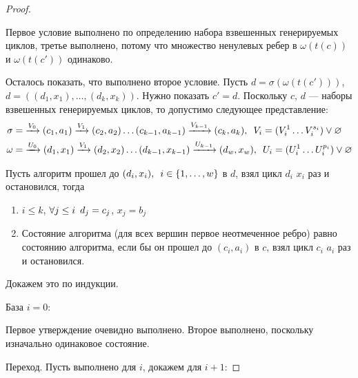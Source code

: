 \documentclass{article}
\newcommand{\squad}{
    \hspace{0.5em}
}
\begin{document}
\begin{proof} $ $
    
    Первое условие выполнено по определению набора взвешенных генерируемых циклов, третье выполнено, потому что множество ненулевых ребер в $\omega(t(c))$ и $\omega(t(c'))$ одинаково.

    Осталось показать, что выполнено второе условие. Пусть $d = \sigma(\omega(t(c')))$, $d = ((d_{1}, x_{1}), \ldots, (d_{k}, x_{k}))$. Нужно показать $c' = d$.
    Поскольку $c$, $d$ --- наборы взвешенных генерируемых циклов, то допустимо следующее представление:
    \begin{align*}
         \sigma = &\xrightarrow{V_{0}} (c_{1}, a_{1}) \xrightarrow{V_{1}} (c_{2}, a_{2}) \ldots (c_{k - 1}, a_{k - 1}) \xrightarrow{V_{k - 1}} (c_{k}, a_{k}), \squad V_{i} = (V_{i}^{1} \ldots V_{i}^{s_{i}}) \lor \varnothing \\
         \omega = &\xrightarrow{U_{0}} (d_{1}, x_{1}) \xrightarrow{V_{1}} (d_{2}, x_{2}) \ldots (d_{k - 1}, x_{k - 1}) \xrightarrow{U_{k - 1}} (d_{w}, x_{w}), \squad U_{i} = (U_{i}^{1} \ldots U_{i}^{p_{i}}) \lor \varnothing \\
    \end{align*}

    Пусть алгоритм прошел до $(d_{i}, x_{i}), \squad i \in \{1, \ldots, w\}$ в $d$, взял цикл $d_{i}$ $x_{i}$ раз и остановился, тогда
    \begin{enumerate}
        \item $i \leq k$, $\forall j \leq i \squad d_{j} = c_{j}$, $x_{j} = b_{j}$ \\
        \item Состояние алгоритма (для всех вершин первое неотмеченное ребро) равно состоянию алгоритма, если бы он прошел до $(c_{i}, a_{i})$ в $c$, взял цикл $c_{i}$ $a_{i}$ раз и остановился.
    \end{enumerate}
    Докажем это по индукции.

    База $i = 0$:

    Первое утверждение очевидно выполнено. Второе выполнено, поскольку изначально одинаковое состояние.

    \medskip

    Переход. Пусть выполнено для $i$, докажем для $i + 1$:


\end{proof}
\end{document}
